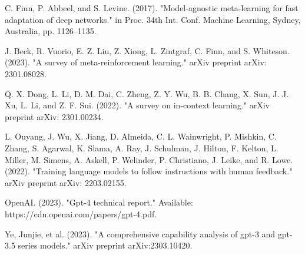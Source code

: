 \documentclass[fleqn,10pt]{thescipub} %
\begin{document}
\begin{enumerate}
C. Finn, P. Abbeel, and S. Levine. (2017). "Model-agnostic meta-learning for fast adaptation of deep networks." in Proc. 34th Int. Conf. Machine Learning, Sydney, Australia, pp. 1126–1135.

J. Beck, R. Vuorio, E. Z. Liu, Z. Xiong, L. Zintgraf, C. Finn, and S. Whiteson. (2023). "A survey of meta-reinforcement learning." arXiv preprint arXiv: 2301.08028.

Q. X. Dong, L. Li, D. M. Dai, C. Zheng, Z. Y. Wu, B. B. Chang, X. Sun, J. J. Xu, L. Li, and Z. F. Sui. (2022). "A survey on in-context learning." arXiv preprint arXiv: 2301.00234.

L. Ouyang, J. Wu, X. Jiang, D. Almeida, C. L. Wainwright, P. Mishkin, C. Zhang, S. Agarwal, K. Slama, A. Ray, J. Schulman, J. Hilton, F. Kelton, L. Miller, M. Simens, A. Askell, P. Welinder, P. Christiano, J. Leike, and R. Lowe. (2022). "Training language models to follow instructions with human feedback." arXiv preprint arXiv: 2203.02155.

OpenAI. (2023). "Gpt-4 technical report." Available: https://cdn.openai.com/papers/gpt-4.pdf.

Ye, Junjie, et al. (2023). "A comprehensive capability analysis of gpt-3 and gpt-3.5 series models." arXiv preprint arXiv:2303.10420.





\end{enumerate}
\end{document}
